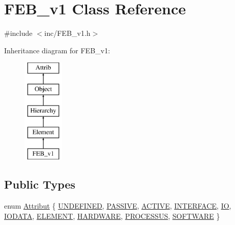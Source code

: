 \hypertarget{classFEB__v1}{}\section{F\+E\+B\+\_\+v1 Class Reference}
\label{classFEB__v1}


{\ttfamily \#include $<$inc/\+F\+E\+B\+\_\+v1.\+h$>$}

Inheritance diagram for F\+E\+B\+\_\+v1\+:\begin{figure}[H]
\begin{center}
\leavevmode
\includegraphics[height=5.000000cm]{classFEB__v1}
\end{center}
\end{figure}
\subsection*{Public Types}
\begin{DoxyCompactItemize}
\item 
enum \hyperlink{classAttrib_a69e171d7cc6417835a5a306d3c764235}{Attribut} \{ \newline
\hyperlink{classAttrib_a69e171d7cc6417835a5a306d3c764235a3a8da2ab97dda18aebab196fe4100531}{U\+N\+D\+E\+F\+I\+N\+ED}, 
\hyperlink{classAttrib_a69e171d7cc6417835a5a306d3c764235a2bfb2af57b87031d190a05fe25dd92ed}{P\+A\+S\+S\+I\+VE}, 
\hyperlink{classAttrib_a69e171d7cc6417835a5a306d3c764235a3b1fec929c0370d1436f2f06e298fb0d}{A\+C\+T\+I\+VE}, 
\hyperlink{classAttrib_a69e171d7cc6417835a5a306d3c764235aa27c16b480a369ea4d18b07b2516bbc7}{I\+N\+T\+E\+R\+F\+A\+CE}, 
\newline
\hyperlink{classAttrib_a69e171d7cc6417835a5a306d3c764235a1420a5b8c0540b2af210b6975eded7f9}{IO}, 
\hyperlink{classAttrib_a69e171d7cc6417835a5a306d3c764235a0af3b0d0ac323c1704e6c69cf90add28}{I\+O\+D\+A\+TA}, 
\hyperlink{classAttrib_a69e171d7cc6417835a5a306d3c764235a7788bc5dd333fd8ce18562b269c9dab1}{E\+L\+E\+M\+E\+NT}, 
\hyperlink{classAttrib_a69e171d7cc6417835a5a306d3c764235a61ceb22149f365f1780d18f9d1459423}{H\+A\+R\+D\+W\+A\+RE}, 
\newline
\hyperlink{classAttrib_a69e171d7cc6417835a5a306d3c764235a75250e29692496e73effca2c0330977f}{P\+R\+O\+C\+E\+S\+S\+US}, 
\hyperlink{classAttrib_a69e171d7cc6417835a5a306d3c764235a103a67cd0b8f07ef478fa45d4356e27b}{S\+O\+F\+T\+W\+A\+RE}
 \}
\end{DoxyCompactItemize}
